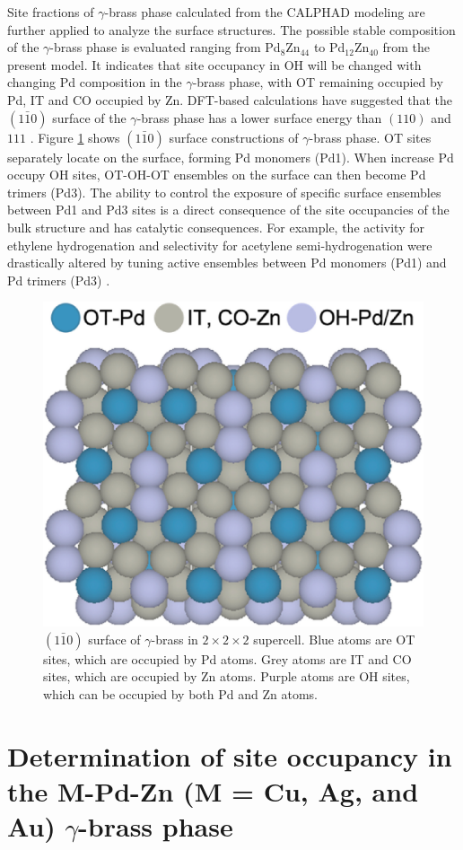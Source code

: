 Site fractions of $\gamma$-brass phase calculated from the CALPHAD modeling are further applied to analyze the surface structures. The possible stable composition of the $\gamma$-brass phase is evaluated ranging from Pd$_8$Zn$_{44}$ to Pd$_{12}$Zn$_{40}$ from the present model. It indicates that site occupancy in OH will be changed with changing Pd composition in the $\gamma$-brass phase, with OT remaining occupied by Pd, IT and CO occupied by Zn. DFT-based calculations have suggested that the $(1\bar{1}0)$ surface of the $\gamma$-brass phase has a lower surface energy than $(110)$ and ${111}$ \cite{Dasgupta2022}. Figure \ref{intermetallics:fig:PdZnSurface} shows $(1\bar{1}0)$ surface constructions of $\gamma$-brass phase. OT sites separately locate on the surface, forming Pd monomers (Pd1). When increase Pd occupy OH sites, OT-OH-OT ensembles on the surface can then become Pd trimers (Pd3). The ability to control the exposure of specific surface ensembles between Pd1 and Pd3 sites is a direct consequence of the site occupancies of the bulk structure and has catalytic consequences. For example, the activity for ethylene hydrogenation and selectivity for acetylene semi-hydrogenation were drastically altered by tuning active ensembles between Pd monomers (Pd1) and Pd trimers (Pd3) \cite{Dasgupta2022}. 

\begin{figure}[H]
    \centering
    \includegraphics[width=0.4\linewidth]{intermetallics/Intermetallics-PdZnSurface.jpg}
    \caption{$(1\bar{1}0)$ surface of $\gamma$-brass in $2\times2\times2$ supercell. Blue atoms are OT sites, which are occupied by Pd atoms. Grey atoms are IT and CO sites, which are occupied by Zn atoms. Purple atoms are OH sites, which can be occupied by both Pd and Zn atoms.}
    \label{intermetallics:fig:PdZnSurface}
\end{figure}

\section{Determination of site occupancy in the M-Pd-Zn (M = Cu, Ag, and Au) \texorpdfstring{$\gamma$}--brass phase} \label{intermetallics:sec:PdZnM}








